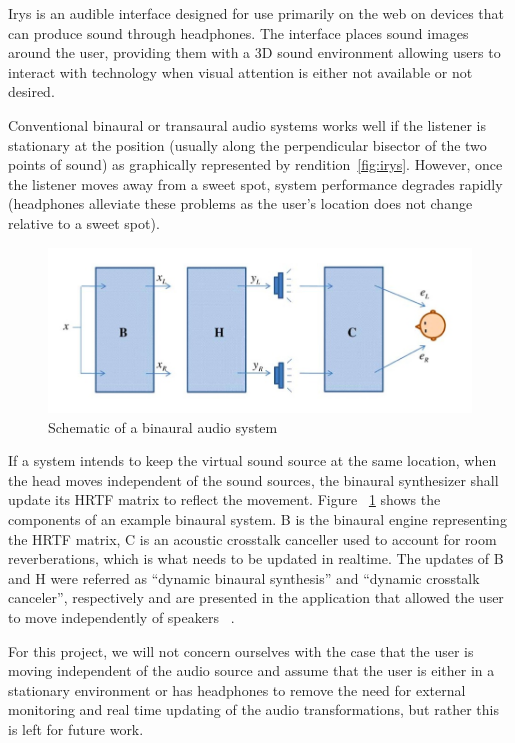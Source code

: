 Irys is an audible interface designed for use primarily on the web on devices
that can produce sound through headphones. The interface places sound images
around the user, providing them with a 3D sound environment allowing users to
interact with technology when visual attention is either not available or not
desired.

Conventional binaural or transaural audio systems works well if the listener is
stationary at the position (usually along the perpendicular bisector of the two
points of sound) as graphically represented by rendition~\ref{fig:irys}. However,
once the listener moves away from a sweet spot, system performance degrades
rapidly (headphones alleviate these problems as the user's location does not
change relative to a sweet spot).

\begin{figure}[h]
  \centering
  \includegraphics[width=1\textwidth]{images/binaural_diagram.jpg}
  \caption{Schematic of a binaural audio system}
  \label{fig:schematic}
\end{figure}

If a system intends to keep the virtual sound source at the same location, when
the head moves independent of the sound sources, the binaural synthesizer shall
update its HRTF matrix to reflect the movement. Figure ~\ref{fig:schematic}
shows the components of an example binaural system.  B is the binaural engine
representing the HRTF matrix, C is an acoustic crosstalk canceller used to
account for room  reverberations, which is what needs to be updated in realtime.
The updates of B and H were referred as “dynamic binaural synthesis” and
“dynamic crosstalk canceler”, respectively and are presented in the application
that allowed the user to move independently of speakers
~\cite{lentz2006dynamic}.

For this project, we will not concern ourselves with the case that the user is
moving independent of the audio source and assume that the user is either in a
stationary environment or has headphones to remove the need for external
monitoring and real time updating of the audio transformations, but rather this is
left for future work.

